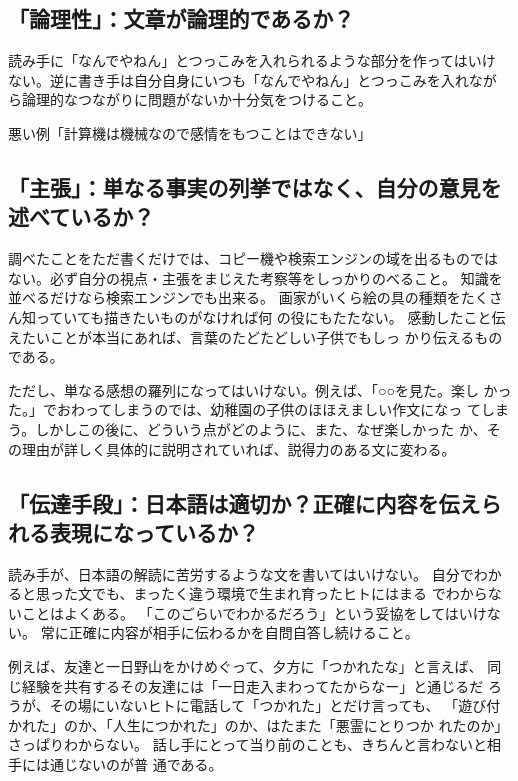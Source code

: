 \documentclass[12pt]{jarticle}
\begin{document}
\subsection{「論理性」：文章が論理的であるか？}

読み手に「なんでやねん」とつっこみを入れられるような部分を作ってはいけ
ない。逆に書き手は自分自身にいつも「なんでやねん」とつっこみを入れなが
ら論理的なつながりに問題がないか十分気をつけること。

悪い例「計算機は機械なので感情をもつことはできない」

\subsection{「主張」：単なる事実の列挙ではなく、自分の意見を述べているか？}

調べたことをただ書くだけでは、コピー機や検索エンジンの域を出るものでは
ない。必ず自分の視点・主張をまじえた考察等をしっかりのべること。
知識を並べるだけなら検索エンジンでも出来る。
画家がいくら絵の具の種類をたくさん知っていても描きたいものがなければ何
の役にもたたない。
感動したこと伝えたいことが本当にあれば、言葉のたどたどしい子供でもしっ
かり伝えるものである。

ただし、単なる感想の羅列になってはいけない。例えば、「○○を見た。楽し
かった。」でおわってしまうのでは、幼稚園の子供のほほえましい作文になっ
てしまう。しかしこの後に、どういう点がどのように、また、なぜ楽しかった
か、その理由が詳しく具体的に説明されていれば、説得力のある文に変わる。

\subsection{「伝達手段」：日本語は適切か？正確に内容を伝えられる表現になっているか？}

読み手が、日本語の解読に苦労するような文を書いてはいけない。
自分でわかると思った文でも、まったく違う環境で生まれ育ったヒトにはまる
でわからないことはよくある。
「このごらいでわかるだろう」という妥協をしてはいけない。
常に正確に内容が相手に伝わるかを自問自答し続けること。

例えば、友達と一日野山をかけめぐって、夕方に「つかれたな」と言えば、
同じ経験を共有するその友達には「一日走入まわってたからなー」と通じるだ
ろうが、その場にいないヒトに電話して「つかれた」とだけ言っても、
「遊び付かれた」のか、「人生につかれた」のか、はたまた「悪霊にとりつか
れたのか」さっぱりわからない。
話し手にとって当り前のことも、きちんと言わないと相手には通じないのが普
通である。
\end{document}
